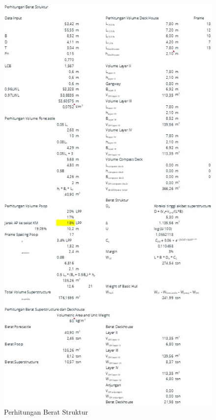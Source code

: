 \begin{figure}[!ht]
    \centering
    \includegraphics[width=\linewidth,height=\textheight,keepaspectratio]{lampiran/deskap-6.jpg}
    \caption*{Perhitungan Berat Struktur}
\end{figure}

